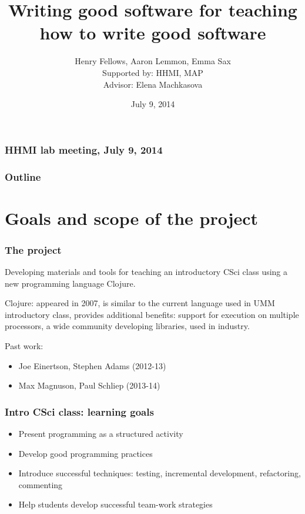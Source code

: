 \documentclass{beamer}
\begin{document}
\author{Henry Fellows, Aaron Lemmon, Emma Sax 
\\ {\small Supported by: HHMI, MAP}
\\ Advisor: Elena Machkasova}
\title{Writing good software for teaching how to write good software}
\date{July 9, 2014}

\begin{frame}
\frametitle{HHMI lab meeting, July 9, 2014}

\maketitle

\end{frame}

\begin{frame}[fragile]
\frametitle{Outline}
	\tableofcontents
\end{frame}


\section{Goals and scope of the project}

\begin{frame}[fragile]
\frametitle{The project}
Developing materials and tools for teaching an introductory CSci class using a new programming language Clojure.

Clojure: appeared in 2007, is similar to the current language used in UMM introductory class, provides additional benefits:
support for execution on multiple processors, a wide community developing libraries, used in industry.

Past work: 
\begin{itemize}
\item Joe Einertson, Stephen Adams (2012-13)
\item  Max Magnuson, Paul Schliep (2013-14)
\end{itemize}  
\end{frame}

\begin{frame}[fragile]
\frametitle{Intro CSci class: learning goals}
\begin{itemize}
\item Present programming as a structured activity
\item Develop good programming practices
\item Introduce successful techniques: testing, incremental development, refactoring, commenting 
\item Help students develop successful team-work strategies
\end{itemize}
\end{frame}
\end{document}
